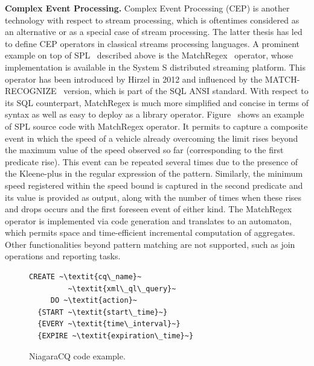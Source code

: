\textbf{Complex Event Processing.}
%
Complex Event Processing (CEP) is another technology with respect to stream processing, which is oftentimes
considered as an alternative or as a special case of stream processing. The latter thesis has led to define CEP
operators in classical streams processing languages. A prominent example on top of SPL~\cite{hirzel_schneider_gedik_2017} described above is the
MatchRegex~\cite{hirzel_2012} operator, whose implementation is available in the System S distributed streaming platform. This operator has been introduced by Hirzel in 2012 and influenced by the MATCH-RECOGNIZE~\cite{zemke_et_al_2007} version, which is part of the SQL ANSI
standard. With respect to its SQL counterpart,  MatchRegex is much more simplified and concise in terms of syntax as well as easy to deploy as a library operator.
Figure~\label{fig:cep} shows an example of SPL source code with MatchRegex operator.
It permits to capture a composite event in which the speed of a vehicle already overcoming the limit rises beyond the maximum value of the speed
observed so far (corresponding to the first predicate rise). This event can be repeated several times due to the presence of the Kleene-plus in the regular expression of the pattern. Similarly,
the minimum speed registered within the speed bound is captured in the second predicate and its value is provided as output, along with the number of times when these rises and drops occurs and the first
foreseen event of either kind. The MatchRegex~\cite{hirzel_2012} operator is implemented via code generation and translates to an automaton, which permits space and time-efficient incremental computation of aggregates. Other functionalities beyond pattern matching are not supported, such as join operations and reporting tasks.


\begin{figure}[!h]
\begin{lstlisting}
CREATE ~\textit{cq\_name}~
         ~\textit{xml\_ql\_query}~
     DO ~\textit{action}~
  {START ~\textit{start\_time}~}
  {EVERY ~\textit{time\_interval}~}
  {EXPIRE ~\textit{expiration\_time}~}
\end{lstlisting}
\vspace*{-4mm}
\caption{\label{fig:Niagra}NiagaraCQ code example.}
\end{figure}

